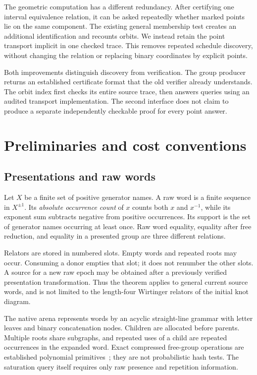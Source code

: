 The geometric computation has a different redundancy. After certifying
one interval equivalence relation, it can be asked repeatedly whether
marked points lie on the same component. The existing general membership
test creates an additional identification and recounts orbits. We instead
retain the point transport implicit in one checked trace. This removes
repeated schedule discovery, without changing the relation or replacing
binary coordinates by explicit points.

Both improvements distinguish discovery from verification. The group
producer returns an established certificate format that the old verifier
already understands. The orbit index first checks its entire source trace,
then answers queries using an audited transport implementation. The second
interface does not claim to produce a separate independently checkable
proof for every point answer.

\section{Preliminaries and cost conventions}
\label{sec:preliminaries}

\subsection{Presentations and raw words}

Let $X$ be a finite set of positive generator names. A raw word is a finite
sequence in $X^{\pm1}$. Its \emph{absolute occurrence count} of $x$ counts
both $x$ and $x^{-1}$, while its exponent sum subtracts negative from
positive occurrences. Its support is the set of generator names occurring
at least once. Raw word equality, equality after free reduction, and
equality in a presented group are three different relations.

Relators are stored in numbered slots. Empty words and repeated roots may
occur. Consuming a donor empties that slot; it does not renumber the other
slots. A source for a new raw epoch may be obtained after a previously
verified presentation transformation. Thus the theorem applies to general
current source words, and is not limited to the length-four Wirtinger
relators of the initial knot diagram.

The native arena represents words by an acyclic straight-line grammar with
letter leaves and binary concatenation nodes. Children are allocated before
parents. Multiple roots share subgraphs, and repeated uses of a child are
repeated occurrences in the expanded word. Exact compressed free-group
operations are established polynomial primitives~\cite{schleimer}; they
are not probabilistic hash tests. The saturation query itself requires
only raw presence and repetition information.

